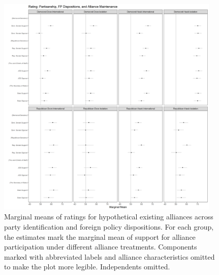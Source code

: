 \documentclass[12pt]{article}
\begin{document}
\begin{figure}[htpb]
	\centering
		\includegraphics[width=0.95\textwidth]{party-dispo-mainapp.png}
	\caption{Marginal means of ratings for hypothetical existing alliances across party identification and foreign policy dispositions. For each group, the estimates mark the marginal mean of support for alliance participation under different alliance treatments. Components marked with abbreviated labels and alliance characteristics omitted to make the plot more legible. Independents omitted.}
	\label{fig:party-dispo-main}
\end{figure}


\newpage 
\end{document}
